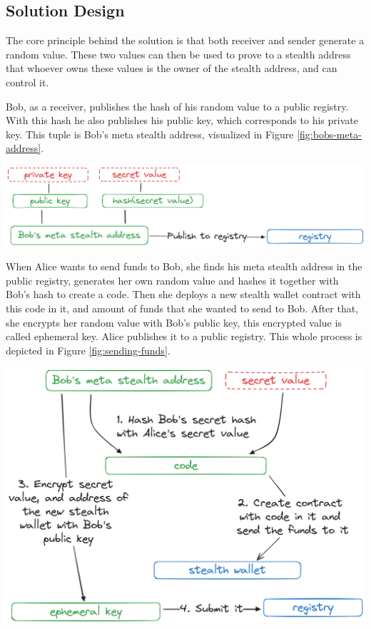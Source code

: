 \documentclass[portrait]{poster}
\begin{document}
\begin{multicols}{2}
\section*{Solution Design}

    The core principle behind the solution is that both receiver
    and sender generate a random value\cite{ButerinIncompleteGuide}.
    These two values can then
    be used to prove to a stealth address that whoever owns these
    values is the owner of the stealth address, and can control it.

    Bob, as a receiver, publishes the hash of his random value to a public
    registry. With this hash he also publishes his public key, which corresponds
    to his private key. This tuple is Bob's meta stealth address, visualized in Figure
    \ref{fig:bobs-meta-address}.

    \begin{center}\vspace{1cm}
        \includegraphics[width=0.7\linewidth]{./assets/meta-stealth-address.png}
        \label{fig:bobs-meta-address}
    \end{center}\vspace{1cm}

    When Alice wants to send funds to Bob, she finds his meta stealth address
    in the public registry, generates her own random value and hashes it together
    with Bob's hash to create a code. Then she deploys a new stealth wallet
    contract with this code in it, and amount of funds that she wanted to send
    to Bob. After that, she encrypts her random value with Bob's public key,
    this encrypted value is called ephemeral key. Alice publishes it to a
    public registry. This whole process is depicted in Figure \ref{fig:sending-funds}. 

    \begin{center}\vspace{1cm}
        \centering
        \includegraphics[width=0.5\linewidth]{../iitsrc/assets/images/sending-funds.png}
        \label{fig:sending-funds}
    \end{center}\vspace{1cm}


\end{multicols}
\end{document}
